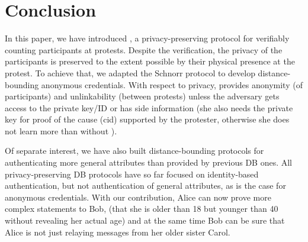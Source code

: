 \section{Conclusion}%
\label{Conclusion}

In this paper, we have introduced \PRIVO, a privacy-preserving protocol for verifiably counting participants at protests. 
Despite the verification, the privacy of the participants is preserved to the extent possible by their physical presence at the protest. 
To achieve that, we adapted the Schnorr protocol to develop distance-bounding anonymous credentials. 
With respect to privacy, \PRIVO provides anonymity (of participants)  and unlinkability (between protests) unless the adversary gets access to the private key/ID or has side information (she also needs the private key for proof of the cause (cid) supported by the protester, otherwise she does not learn more than without \PRIVO).

Of separate interest, we have also built distance-bounding protocols for authenticating more general attributes than provided by previous \ac{DB} ones.
All privacy-preserving \ac{DB} protocols have so far focused on identity-based authentication, but not authentication of general attributes, as is the case for anonymous credentials.
With our contribution, Alice can now prove more complex statements to Bob, (\eg  that she is older than 18 but younger than 40 without revealing her actual age) and at the same time Bob can be sure that Alice is not just relaying messages from her older sister Carol.


